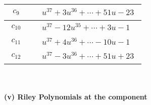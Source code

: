 \documentclass[1p]{elsarticle_modified}
\theoremstyle{definition}
\begin{document}
\begin{tabular}{m{50pt}|m{274pt}}
\hline $$\begin{aligned}c_{9}\end{aligned}$$&$\begin{aligned}
&u^{37}+3 u^{36}+\cdots+51 u-23
\end{aligned}$\\
\hline $$\begin{aligned}c_{10}\end{aligned}$$&$\begin{aligned}
&u^{37}-12 u^{35}+\cdots+3 u-1
\end{aligned}$\\
\hline $$\begin{aligned}c_{11}\end{aligned}$$&$\begin{aligned}
&u^{37}+4 u^{36}+\cdots-10 u-1
\end{aligned}$\\
\hline $$\begin{aligned}c_{12}\end{aligned}$$&$\begin{aligned}
&u^{37}-3 u^{36}+\cdots+51 u+23
\end{aligned}$\\
\hline
\end{tabular}\\~\\
\newpage\renewcommand{\arraystretch}{1}
\flushleft \textbf{(v) Riley Polynomials at the component}\newline \\
\end{document}
